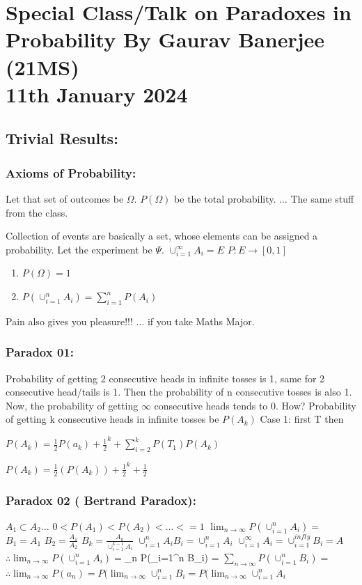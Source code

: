 \documentclass{article}
\theoremstyle{definition}
\begin{document}
\section{Special Class/Talk on Paradoxes in Probability By Gaurav Banerjee (21MS) \\ 11th January 2024}
\subsection{Trivial Results:}
\subsubsection{Axioms of Probability:}
Let that set of outcomes be $\Omega$. $P(\Omega)$ be the total probability.
$\dots$ The same stuff from the class.

Collection of events are basically a set, whose elements can be assigned a probability.
Let the experiment be $\Psi$. $\cup_{i=1}^{\infty} A_i = E$ 
$P: E \to [0,1]$
\begin{enumerate}
    \item $P(\Omega) = 1$
    \item $P(\cup_{i=1}^{n} A_i)  = \sum_{i=1}^{n} P(A_i)$
\end{enumerate}
\begin{mdframed}
    Pain also gives you pleasure!!!
    $\dots$ if you take Maths Major.
\end{mdframed}
\subsubsection{Paradox 01:}
Probability of getting 2 consecutive heads in infinite tosses is 1, same for 2 consecutive head/tails is 1. Then the probability of n consecutive tosses is also 1.  Now, the probability of getting $\infty$ consecutive heads tends to 0. How?
Probability of getting k consecutive heads in infinite tosses be $P(A_k)$
Case 1:
first T then 

$P(A_k) = \frac{1}{2} P(a_k) + \frac{1}{2}^{k} + \sum_{i=2}^{k} P(T_1) P(A_k)$


$P(A_k) = \frac{1}{2} (P(A_k)) + \frac{1}{2}^k + \frac{1}{2}$


\subsubsection{Paradox 02 ( Bertrand Paradox):}

$A_1 \subset A_2 \dots $
$0< P(A_1) < P(A_2) < \dots <=1$
$\lim_{n \to \infty}P(\cup_{i=1}^{n} A_i) = $
$B_1 = A_1$
$B_2 = \frac{A_1}{A_2}$
$B_k = \frac{A_k}{\cup_{i=1}^{k-1} A_i}$
$\cup_{i=1}^{n} A_i B_i = \cup_{i=1}^{n} A_i$
$\cup_{i=1}^{\infty} A_i = \cup_{i=1}^{infty} B_i = A$
$\therefore \lim_{n \to \infty}P(\cup_{i=1}^{n} A_i) = $\lim_{n \to \infty}P(\cup_{i=1}^{n} B_i) = $\sum_{n \to \infty}P(\cup_{i=1}^{n} B_i) = $  
$\therefore \lim_{n \to \infty} P(a_n) = P(\lim_{n \to \infty} \cup_{i=1}^{n} B_i =P(\lim_{n \to \infty} \cup_{i=1}^{n} A_i  $
\end{document}
